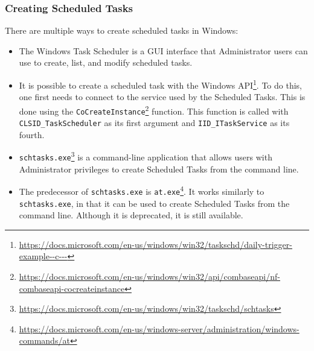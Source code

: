 \subsubsection{Creating Scheduled Tasks}
There are multiple ways to create scheduled tasks in Windows:
\begin{itemize}
    \item The Windows Task Scheduler is a GUI interface that Administrator users can use to create, list, and modify scheduled tasks.

    \item It is possible to create a scheduled task with the Windows API\footnote{\tiny \url{https://docs.microsoft.com/en-us/windows/win32/taskschd/daily-trigger-example--c---}}. To do this, one first needs to connect to the service used by the Scheduled Tasks. This is done using the \texttt{CoCreateInstance}\footnote{\tiny \url{https://docs.microsoft.com/en-us/windows/win32/api/combaseapi/nf-combaseapi-cocreateinstance}} function. This function is called with \texttt{CLSID\_TaskScheduler} as its first argument and \texttt{IID\_ITaskService} as its fourth.

    \item \texttt{schtasks.exe}\footnote{\tiny \url{https://docs.microsoft.com/en-us/windows/win32/taskschd/schtasks}} is a command-line application that allows users with Administrator privileges to create Scheduled Tasks from the command line.

    \item The predecessor of \texttt{schtasks.exe} is \texttt{at.exe}\footnote{\tiny \url{https://docs.microsoft.com/en-us/windows-server/administration/windows-commands/at}}. It works similarly to \texttt{schtasks.exe}, in that it can be used to create Scheduled Tasks from the command line. Although it is deprecated, it is still available.
\end{itemize}
